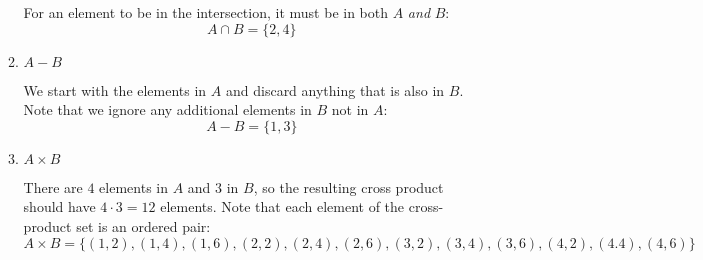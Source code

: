 \documentclass[letterpaper,12pt,fleqn]{article}
\begin{document}
\begin{enumerate}
\begin{enumerate}
    For an element to be in the intersection, it must be in both $A$ \emph{and}
    $B$:
    \[A\cap B=\{2,4\}\]
    
  \item $A-B$

    We start with the elements in $A$ and discard anything that is also in $B$.
    Note that we ignore any additional elements in $B$ not in $A$:
    \[A-B=\{1,3\}\]
    
  \item $A\times B$

    There are $4$ elements in $A$ and $3$ in $B$, so the resulting cross
    product should have $4\cdot3=12$ elements. Note that each element of the
    cross-product set is an ordered pair:
    \[A\times B=\{(1,2),(1,4),(1,6),(2,2),(2,4),(2,6),(3,2),(3,4),(3,6),
    (4,2),(4.4),(4,6)\}\]
  \end{enumerate}
\end{enumerate}
\end{document}
